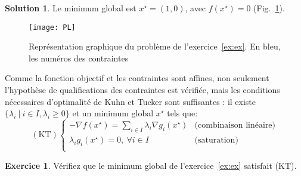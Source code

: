 \documentclass[a4paper,francais]{article}
\theoremstyle{definition}
\newtheorem{exercice}{Exercice}[section]
\newtheorem*{solution}{Solution}
\begin{document}
\begin{solution}
Le minimum global est $x^\star = (1,0)$, avec $f(x^\star) = 0$ (Fig.~\ref{fig:exPL}).  
\begin{figure}
  \centering
  \texttt{[image: PL]}
  \caption{Représentation graphique du problème de l'exercice~\ref{ex:ex}.
    En bleu, les numéros des contraintes}
  \label{fig:exPL}
\end{figure}
\end{solution}

Comme la fonction objectif et les contraintes sont affines, non seulement
l'hypothèse de qualifications des contraintes est vérifiée, mais les conditions
nécessaires d'optimalité de Kuhn et Tucker sont suffisantes : 
il existe $\{\lambda_i \ | \ i \in I, \lambda_i \geq 0\}$ et un minimum global
$x^\star$ tels que:
\[
(\text{KT})
\left\{
\begin{array}{ll}
  -{\nabla f}(x^\star) = \sum_{i \in I} \lambda_i {\nabla g_i}(x^\star) & \text{(combinaison linéaire)}\\
  \lambda_i g_i(x^\star) = 0, \ \forall i \in I  & \text{(saturation)}\\
\end{array}
\right.
\]

\begin{exercice}
Vérifiez que le minimum global de l'exercice~\ref{ex:ex} satisfait (KT). 
\end{exercice}
\end{document}

